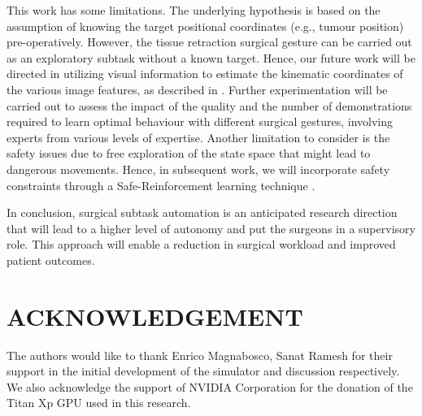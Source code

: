 \documentclass[letterpaper, 10 pt, conference]{ieeeconf}
\begin{document}
This work has some limitations. The underlying hypothesis is based on the assumption of knowing the target positional coordinates (e.g., tumour position) pre-operatively. However, the tissue retraction surgical gesture can be carried out as an exploratory subtask without a known target. Hence, our future work will be directed in utilizing visual information to estimate the kinematic coordinates of the various image features, as described in \cite{attanasio2020autonomous, li2020super}. Further experimentation will be carried out to assess the impact of the quality and the number of demonstrations required to learn optimal behaviour with different surgical gestures, involving experts from various levels of expertise. Another limitation to consider is the safety issues due to free exploration of the state space that might lead to dangerous movements. Hence, in subsequent work, we will incorporate safety constraints through a Safe-Reinforcement learning technique \cite{cheng2019end}.

In conclusion, surgical subtask automation is an anticipated research direction that will lead to a higher level of autonomy and put the surgeons in a supervisory role. This approach will enable a reduction in surgical workload and improved patient outcomes. 

\section*{ACKNOWLEDGEMENT}

The authors would like to thank Enrico Magnabosco, Sanat Ramesh for their support in the initial development of the simulator and discussion respectively. We also acknowledge the support of NVIDIA Corporation for the donation of the Titan Xp GPU used in this research.


\end{document}

